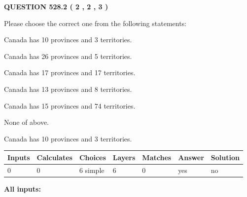 \documentclass[12pt]{article}
\begin{document}
   
  
\vspace{0.2in}
  
{\textbf{\Large{QUESTION
528.2 
 ( 2 , 2 , 3 )
}}}
  
  
Please choose the correct one from the following statements:
 
 
Canada has 10  provinces and 3 territories.
 
 
Canada has  26 provinces and  5 territories.
 
 
Canada has  17 provinces and  17 territories.
 
 
Canada has  13 provinces and  8 territories.
 
 
Canada has  15 provinces and  74 territories.
 
 
 None of above.
 
 
\noindent{}
 
 
Canada has 10  provinces and 3 territories.
 
 
\noindent{}
 
 
   
   
   
   
\noindent\begin{tabular}{|l|l|l|l|l|l|l|}
 \hline
Inputs & Calculates & Choices & Layers & Matches & Answer & Solution \\ \hline
 0  & 
 0  & 
 6
  simple  
  & 
 6  & 
 0  & 
  yes & 
  no 
  \\ \hline
 \end{tabular}
   
   
   
   
\noindent{}
   
   
   
   
\noindent\vspace{0.1in}\hspace{-0.08in} {\textbf{\Large{All inputs: }}}
   
   
   
   
   
   
 \vspace{0.2in}
 
\end{document}

